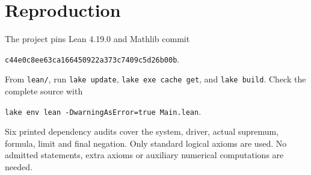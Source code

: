 \documentclass[11pt]{article}
\begin{document}
\section*{Reproduction}
The project pins Lean 4.19.0 and Mathlib commit
\begin{center}\small\texttt{c44e0c8ee63ca166450922a373c7409c5d26b00b}.\end{center}
From \texttt{lean/}, run \texttt{lake update}, \texttt{lake exe cache get},
and \texttt{lake build}. Check the complete source with
\begin{center}\small\texttt{lake env lean -DwarningAsError=true Main.lean}.\end{center}
Six printed dependency audits cover the system, driver, actual supremum,
formula, limit and final negation. Only standard logical axioms are used.
No admitted statements, extra axioms or auxiliary numerical computations
are needed.
\end{document}
